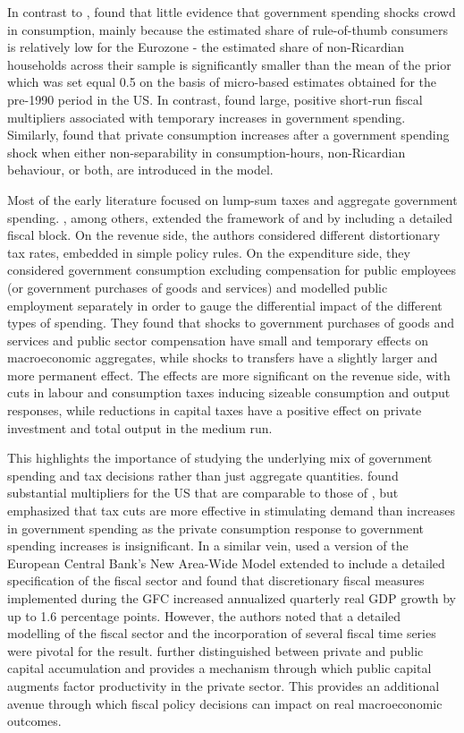 \documentclass[a4paper,11pt]{article}
\numberwithin{equation}{section}
\begin{document}
	In contrast to \cite{gali}, \cite{coenen2005} found that little evidence that government spending shocks crowd in consumption, mainly because the estimated share of rule-of-thumb consumers is relatively low for the Eurozone - the estimated share of non-Ricardian households across their sample is significantly smaller than the mean of the prior which was set equal 0.5 on the basis of micro-based estimates obtained for the pre-1990 period in the US. In contrast, \cite{erceg2006} found large, positive short-run fiscal multipliers associated with temporary increases in government spending. Similarly, \cite{rabanal2006} found that private consumption increases after a government spending shock when either non-separability in consumption-hours, non-Ricardian behaviour, or both, are introduced in the model.  
	
	Most of the early literature focused on lump-sum taxes and aggregate government spending. \cite{forni2009}, among others, extended the framework of \cite{christiano2005} and \cite{gali} by including a detailed fiscal block. On the revenue side, the authors considered different distortionary tax rates, embedded in simple policy rules. On the expenditure side, they considered government consumption excluding compensation for public employees (or government purchases of goods and services) and modelled public employment separately in order to gauge the differential impact of the different types of spending. They found that shocks to government purchases of goods and services and public sector compensation have small and temporary effects on macroeconomic aggregates, while shocks to transfers have a slightly larger and more permanent effect. The effects are more significant on the revenue side, with cuts in labour and consumption taxes inducing sizeable consumption and output responses, while reductions in capital taxes have a positive effect on private investment and total output in the medium run. 
	
	This highlights the importance of studying the underlying mix of government spending and tax decisions rather than just aggregate quantities. \cite{mountford} found substantial multipliers for the US that are comparable to those of \cite{blanchard2002}, but emphasized that tax cuts are more effective in stimulating demand than increases in government spending as the private consumption response to government spending increases is insignificant. In a similar vein, \cite{coenen2012} used a version of the European Central Bank's New Area-Wide Model extended to include a detailed specification of the fiscal sector and found that discretionary fiscal measures implemented during the GFC increased annualized quarterly real GDP growth by up to 1.6 percentage points. However, the authors noted that a detailed modelling of the fiscal sector and the incorporation of several fiscal time series were pivotal for the result. \cite{carvalho2011} further distinguished between private and public capital accumulation and provides a mechanism through which public capital augments factor productivity in the private sector. This provides an additional avenue through which fiscal policy decisions can impact on real macroeconomic outcomes. 
	
\end{document}
